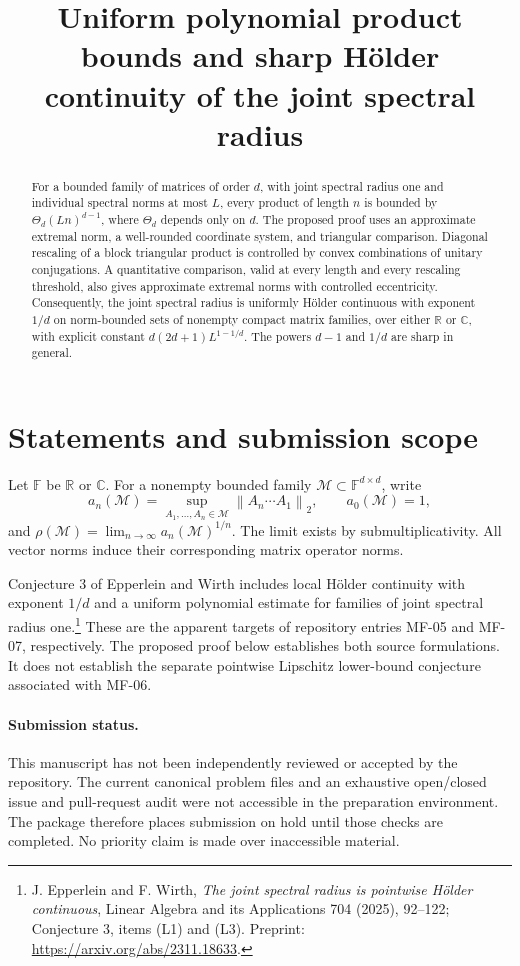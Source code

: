 \documentclass[11pt]{article}
\title{Uniform polynomial product bounds and sharp H\"older continuity of the joint spectral radius}
\author{}\date{}
\theoremstyle{remark}\newtheorem{remark}[theorem]{Remark}
\newcommand{\F}{\mathbb F}
\newcommand{\R}{\mathbb R}
\newcommand{\C}{\mathbb C}
\newcommand{\norm}[1]{\left\lVert #1\right\rVert_2}
\begin{document}
\maketitle\vspace{-2em}
\begin{abstract}
For a bounded family of matrices of order $d$, with joint spectral radius one and individual spectral norms at most $L$, every product of length $n$ is bounded by $\Theta_d(Ln)^{d-1}$, where $\Theta_d$ depends only on $d$. The proposed proof uses an approximate extremal norm, a well-rounded coordinate system, and triangular comparison. Diagonal rescaling of a block triangular product is controlled by convex combinations of unitary conjugations. A quantitative comparison, valid at every length and every rescaling threshold, also gives approximate extremal norms with controlled eccentricity. Consequently, the joint spectral radius is uniformly H\"older continuous with exponent $1/d$ on norm-bounded sets of nonempty compact matrix families, over either $\R$ or $\C$, with explicit constant $d(2d+1)L^{1-1/d}$. The powers $d-1$ and $1/d$ are sharp in general.
\end{abstract}

\section{Statements and submission scope}
Let $\F$ be $\R$ or $\C$. For a nonempty bounded family $\mathcal M\subset\F^{d\times d}$, write
\[
 a_n(\mathcal M)=\sup_{A_1,\ldots,A_n\in\mathcal M}
                    \norm{A_n\cdots A_1},\qquad a_0(\mathcal M)=1,
\]
and $\rho(\mathcal M)=\lim_{n\to\infty}a_n(\mathcal M)^{1/n}$. The limit exists by submultiplicativity. All vector norms induce their corresponding matrix operator norms.

Conjecture 3 of Epperlein and Wirth includes local H\"older continuity with exponent $1/d$ and a uniform polynomial estimate for families of joint spectral radius one.\footnote{J. Epperlein and F. Wirth, \emph{The joint spectral radius is pointwise H\"older continuous}, Linear Algebra and its Applications 704 (2025), 92--122; Conjecture 3, items (L1) and (L3). Preprint: \url{https://arxiv.org/abs/2311.18633}.} These are the apparent targets of repository entries MF-05 and MF-07, respectively. The proposed proof below establishes both source formulations. It does not establish the separate pointwise Lipschitz lower-bound conjecture associated with MF-06.

\paragraph{Submission status.}
This manuscript has not been independently reviewed or accepted by the repository. The current canonical problem files and an exhaustive open/closed issue and pull-request audit were not accessible in the preparation environment. The package therefore places submission on hold until those checks are completed. No priority claim is made over inaccessible material.
\end{document}
